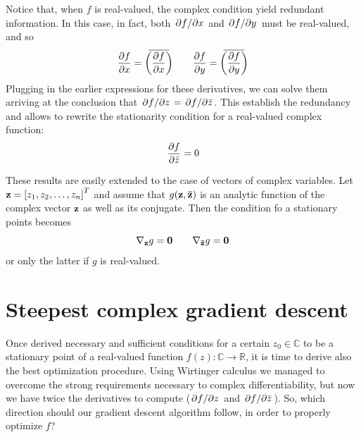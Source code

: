 \documentclass[../main.tex]{subfiles}
\begin{document}
Notice that, when $f$ is real-valued, the complex condition yield redundant information. In this case, in fact, both $\pdv*{f}{x}$ and $\pdv*{f}{y}$ must be real-valued, and so
\[ \pdv{f}{x} = \overbar{\left(\pdv{f}{x}\right)} \qquad \pdv{f}{y} = \overbar{\left(\pdv{f}{y}\right)} \]
Plugging in the earlier expressions for these derivatives, we can solve them arriving at the conclusion that $\pdv*{f}{z} = \pdv*{f}{\bar{z}}$. This establish the redundancy and allows to rewrite the stationarity condition for a real-valued complex function:
\[ \pdv{f}{\bar{z}} = 0 \]

These results are easily extended to the case of vectors of complex variables. Let $\vb{z} = \left[z_1, z_2, \dots, z_n\right]^T$ and assume that $g(\vb{z}, \vb{\bar{z}})$ is an analytic function of the complex vector $\vb{z}$ as well as its conjugate. Then the condition fo a stationary points becomes
\[ \nabla_{\vb{z}}g = \vb{0} \qquad \nabla_{\vb{\bar{z}}}g = \vb{0} \]
or only the latter if $g$ is real-valued.

\section{Steepest complex gradient descent \cite{Hualiang_nonlinear}}

Once derived necessary and sufficient conditions for a certain $z_0\in\mathds{C}$ to be a stationary point of a real-valued function $f(z):\mathds{C}\to\mathds{R}$, it is time to derive also the best optimization procedure. Using Wirtinger calculus we managed to overcome the strong requirements necessary to complex differentiability, but now we have twice the derivatives to compute ($\pdv*{f}{z}$ and $\pdv*{f}{\bar{z}}$). So, which direction should our gradient descent algorithm follow, in order to properly optimize $f$?\\
\end{document}
